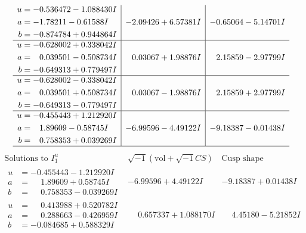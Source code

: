 \documentclass[1p]{elsarticle_modified}
\theoremstyle{definition}
\newcommand{\I}{\sqrt{-1}}
\begin{document}
$$\begin{array}{c|c|c}
\begin{aligned}
u &= -0.536472 - 1.088430 I \\
a &= -1.78211 - 0.61588 I \\
b &= -0.874784 + 0.944864 I\end{aligned}
 & -2.09426 + 6.57381 I & -0.65064 - 5.14701 I \\ \hline\begin{aligned}
u &= -0.628002 + 0.338042 I \\
a &= \phantom{-}0.039501 - 0.508734 I \\
b &= -0.649313 + 0.779497 I\end{aligned}
 & \phantom{-}0.03067 + 1.98876 I & \phantom{-}2.15859 - 2.97799 I \\ \hline\begin{aligned}
u &= -0.628002 - 0.338042 I \\
a &= \phantom{-}0.039501 + 0.508734 I \\
b &= -0.649313 - 0.779497 I\end{aligned}
 & \phantom{-}0.03067 - 1.98876 I & \phantom{-}2.15859 + 2.97799 I \\ \hline\begin{aligned}
u &= -0.455443 + 1.212920 I \\
a &= \phantom{-}1.89609 - 0.58745 I \\
b &= \phantom{-}0.758353 + 0.039269 I\end{aligned}
 & -6.99596 - 4.49122 I & -9.18387 - 0.01438 I\\
 \hline 
 \end{array}$$\newpage$$\begin{array}{c|c|c}  
\text{Solutions to }I^u_{1}& \I (\text{vol} + \sqrt{-1}CS) & \text{Cusp shape}\\
 \hline 
\begin{aligned}
u &= -0.455443 - 1.212920 I \\
a &= \phantom{-}1.89609 + 0.58745 I \\
b &= \phantom{-}0.758353 - 0.039269 I\end{aligned}
 & -6.99596 + 4.49122 I & -9.18387 + 0.01438 I \\ \hline\begin{aligned}
u &= \phantom{-}0.413988 + 0.520782 I \\
a &= \phantom{-}0.288663 - 0.426959 I \\
b &= -0.084685 + 0.588329 I\end{aligned}
 & \phantom{-}0.657337 + 1.088170 I & \phantom{-}4.45180 - 5.21852 I \\ \hline\begin{aligned}

\end{aligned}
\end{array}$$
\end{document}

